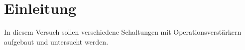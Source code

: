 \section{Einleitung}

In diesem Versuch sollen verschiedene Schaltungen mit Operationsverstärkern aufgebaut und untersucht werden.